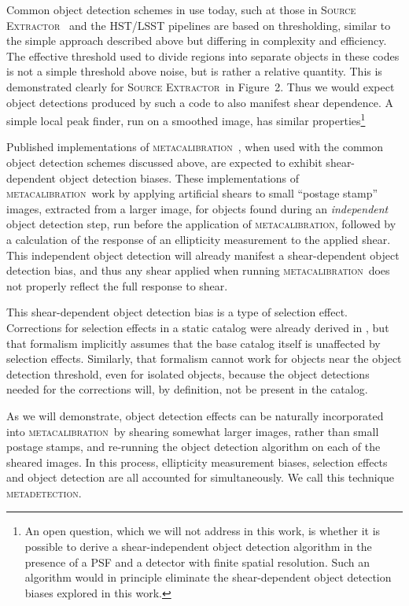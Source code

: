 \documentclass[iop, appendixfloats, numberedappendix, apj]{emulateapj}
\newcommand{\mcal}{\textsc{metacalibration}}
\newcommand{\mdet}{\textsc{metadetection}}
\newcommand{\sx}{\textsc{Source Extractor}}
\begin{document}
Common object detection schemes in use today, such at those in \sx\
\citep{Bertin96} and the HST/LSST pipelines \citep{BoschHSC2018,BoschLSST2018}
are based on thresholding, similar to the simple approach described above but
differing in complexity and efficiency. The effective threshold used to divide
regions into separate objects in these codes is not a simple threshold above
noise, but is rather a relative quantity.  This is demonstrated clearly for
\sx\ in \cite{Bertin96} Figure~2.  Thus we would expect object detections
produced by such a code to also manifest shear dependence. A simple local peak
finder, run on a smoothed image, has similar properties\footnote{An open question,
which we will not address in this work, is whether it is possible to derive a
shear-independent object detection algorithm  in the presence of a PSF and a
detector with finite spatial resolution.  Such an algorithm would in principle
eliminate the shear-dependent object detection biases explored in this work.}

Published implementations of \mcal\
\citep[e.g.,][]{HuffMcal2017,SheldonMcal2017}, when used with the common object
detection schemes discussed above, are expected to exhibit shear-dependent
object detection biases. These implementations of \mcal\ work by applying
artificial shears to small ``postage stamp'' images, extracted from a larger
image, for objects found during an {\em independent} object detection step, run
before the application of \mcal, followed by a calculation of the response of
an ellipticity measurement to the applied shear. This independent object
detection will already manifest a shear-dependent object detection bias, and
thus any shear applied when running \mcal\ does not properly reflect the full
response to shear.

This shear-dependent object detection bias is a type of selection effect.
Corrections for selection effects in a static catalog were already derived in
\cite{SheldonMcal2017}, but that formalism implicitly assumes that the base
catalog itself is unaffected by selection effects.  Similarly, that formalism
cannot work for objects near the object detection threshold, even for isolated
objects, because the object detections needed for the corrections will, by
definition, not be present in the catalog.

As we will demonstrate, object detection effects can be naturally incorporated
into \mcal\ by shearing somewhat larger images, rather than small postage
stamps, and re-running the object detection algorithm on each of the sheared
images. In this process, ellipticity measurement biases, selection effects and
object detection are all accounted for simultaneously. We call this technique
\mdet.
\end{document}
